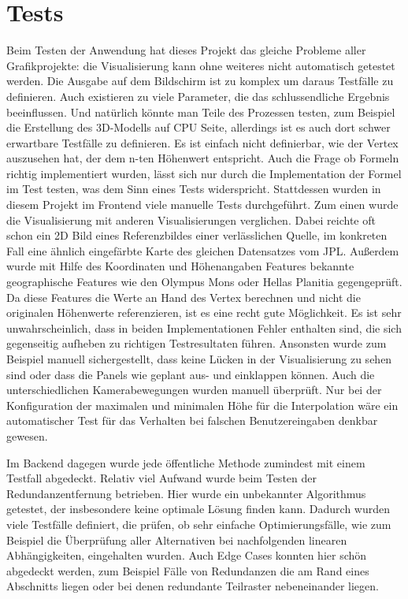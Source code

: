 
\section{Tests}
Beim Testen der Anwendung hat dieses Projekt das gleiche Probleme aller Grafikprojekte: die Visualisierung kann ohne weiteres nicht automatisch getestet werden. Die Ausgabe auf dem Bildschirm ist zu komplex um daraus Testfälle zu definieren. Auch existieren zu viele Parameter, die das schlussendliche Ergebnis beeinflussen. Und natürlich könnte man Teile des Prozessen testen, zum Beispiel die Erstellung des 3D-Modells auf CPU Seite, allerdings ist es auch dort schwer erwartbare Testfälle zu definieren. Es ist einfach nicht definierbar, wie der Vertex auszusehen hat, der dem n-ten Höhenwert entspricht. Auch die Frage ob Formeln richtig implementiert wurden, lässt sich nur durch die Implementation der Formel im Test testen, was dem Sinn eines Tests widerspricht. Stattdessen wurden in diesem Projekt im Frontend viele manuelle Tests durchgeführt. Zum einen wurde die Visualisierung mit anderen Visualisierungen verglichen. Dabei reichte oft schon ein 2D Bild eines Referenzbildes einer verlässlichen Quelle, im konkreten Fall eine ähnlich eingefärbte Karte des gleichen Datensatzes vom JPL. Außerdem wurde mit Hilfe des Koordinaten und Höhenangaben Features bekannte geographische Features wie den Olympus Mons oder Hellas Planitia gegengeprüft. Da diese Features die Werte an Hand des Vertex berechnen und nicht die originalen Höhenwerte referenzieren, ist es eine recht gute Möglichkeit. Es ist sehr unwahrscheinlich, dass in beiden Implementationen Fehler enthalten sind, die sich gegenseitig aufheben zu richtigen Testresultaten führen. Ansonsten wurde zum Beispiel manuell sichergestellt, dass keine Lücken in der Visualisierung zu sehen sind oder dass die Panels wie geplant aus- und einklappen können. Auch die unterschiedlichen Kamerabewegungen wurden manuell überprüft. Nur bei der Konfiguration der maximalen und minimalen Höhe für die Interpolation wäre ein automatischer Test für das Verhalten bei falschen Benutzereingaben denkbar gewesen. 

Im Backend dagegen wurde jede öffentliche Methode zumindest mit einem Testfall abgedeckt. Relativ viel Aufwand wurde beim Testen der Redundanzentfernung betrieben. Hier wurde ein unbekannter Algorithmus getestet, der insbesondere keine optimale Lösung finden kann. Dadurch wurden viele Testfälle definiert, die prüfen, ob sehr einfache Optimierungsfälle, wie zum Beispiel die Überprüfung aller Alternativen bei nachfolgenden linearen Abhängigkeiten, eingehalten wurden. Auch Edge Cases konnten hier schön abgedeckt werden, zum Beispiel Fälle von Redundanzen die am Rand eines Abschnitts liegen oder bei denen redundante Teilraster nebeneinander liegen.
